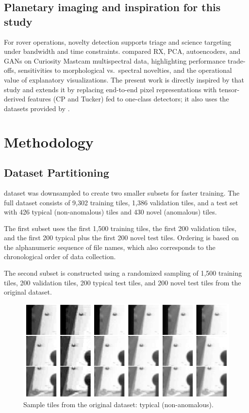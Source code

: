 \documentclass[pdflatex,sn-mathphys-ay]{sn-jnl}
\begin{document}
\subsection{Planetary imaging and inspiration for this study}
For rover operations, novelty detection supports triage and science targeting under bandwidth and time constraints. \citet{Kerner2020} compared RX, PCA, autoencoders, and GANs on Curiosity Mastcam multispectral data, highlighting performance trade-offs, sensitivities to morphological vs.\ spectral novelties, and the operational value of explanatory visualizations. The present work is directly inspired by that study and extends it by replacing end-to-end pixel representations with tensor-derived features (CP and Tucker) fed to one-class detectors; it also uses the datasets provided by \citet{Kerner2020}.


\section{Methodology}\label{sec:methodology}

\subsection{Dataset Partitioning}

\citet{Kerner2020} dataset was downsampled to create two smaller subsets for faster training. The full dataset consists of 9,302 training tiles, 1,386 validation tiles, and a test set with 426 typical (non-anomalous) tiles and 430 novel (anomalous) tiles.  

The first subset uses the first 1,500 training tiles, the first 200 validation tiles, and the first 200 typical plus the first 200 novel test tiles. Ordering is based on the alphanumeric sequence of file names, which also corresponds to the chronological order of data collection.  

The second subset is constructed using a randomized sampling of 1,500 training tiles, 200 validation tiles, 200 typical test tiles, and 200 novel test tiles from the original dataset.

\begin{figure}
  \centering
  \includegraphics[width=\linewidth]{Raw images gray.png}
  \caption{Sample tiles from the original dataset: typical (non-anomalous).}
  \label{fig:dataset-samples}
\end{figure}
\end{document}
